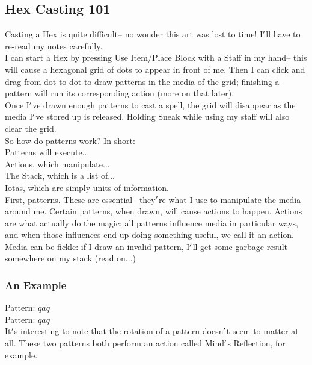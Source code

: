 \documentclass[12pt]{article}
\begin{document}
\label{sec:casting/101}
\subsection*{Hex Casting 101}


  
    Casting a Hex is quite difficult-- no wonder this art was lost to time! I$\rq$ll have to re-read my notes carefully.\\I can start a Hex by pressing Use Item/Place Block with a Staff in my hand-- this will cause a hexagonal grid of dots to appear in front of me. Then I can click and drag from dot to dot to draw patterns in the media of the grid; finishing a pattern will run its corresponding action (more on that later).\\


  
    Once I$\rq$ve drawn enough patterns to cast a spell, the grid will disappear as the media I$\rq$ve stored up is released. Holding Sneak while using my staff will also clear the grid.\\So how do patterns work? In short:\\Patterns will execute...\\Actions, which manipulate...\\The Stack, which is a list of...\\Iotas, which are simply units of information.\\


  
    First, patterns. These are essential-- they$\rq$re what I use to manipulate the media around me. Certain patterns, when drawn, will cause actions to happen. Actions are what actually do the magic; all patterns influence media in particular ways, and when those influences end up doing something useful, we call it an action.\\Media can be fickle: if I draw an invalid pattern, I$\rq$ll get some garbage result somewhere on my stack (read on...)\\


  \subsubsection*{An Example}

    Pattern: $qaq$\\
    Pattern: $qaq$\\
      It$\rq$s interesting to note that the rotation of a pattern doesn$\rq$t seem to matter at all. These two patterns both perform an action called Mind$\rq$s Reflection, for example.\\
\end{document}
